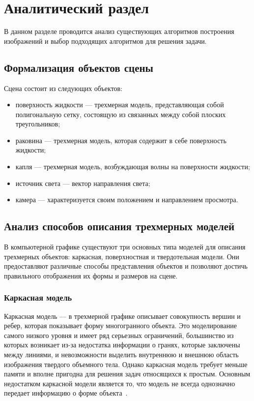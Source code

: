 \chapter{Аналитический раздел}

В данном разделе проводится анализ существующих алгоритмов построения изображений и выбор подходящих алгоритмов для решения задачи.

\section{Формализация объектов сцены}

Сцена состоит из следующих объектов:
\begin{itemize}[label*=---]
    \item поверхность жидкости --- трехмерная модель, представляющая собой полигональную сетку, состоящую из связанных между собой плоских треугольников;
    \item раковина --- трехмерная модель, которая содержит в себе поверхность жидкости;
    \item капля --- трехмерная модель, возбуждающая волны на поверхности жидкости;
    \item источник света --- вектор направления света;
    \item камера --- характеризуется своим положением и направлением просмотра.
\end{itemize}

\section{Анализ способов описания трехмерных моделей}

В компьютерной графике существуют три основных типа моделей для описания трехмерных объектов: каркасная, поверхностная и твердотельная модели. 
Они предоставляют различные способы представления объектов и позволяют 
достичь правильного отображения их формы и размеров на сцене.

\subsection{Каркасная модель}
Каркасная модель --- в трехмерной графике описывает совокупность вершин и ребер, которая показывает форму многогранного объекта. 
Это моделирование самого низкого уровня и имеет ряд серьезных ограничений, большинство из которых возникает из-за недостатка информации о гранях, которые заключены между линиями, и невозможности выделить внутреннюю и внешнюю область изображения твердого объемного тела. 
Однако каркасная модель требует меньше памяти и вполне пригодна для решения задач относящихся к простым. 
Основным недостатком каркасной модели является то, что модель не всегда однозначно передает информацию о форме объекта~\cite{MTM}.

